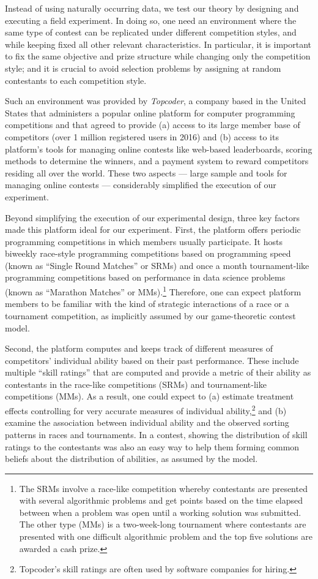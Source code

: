 \documentclass[10pt, titlepage]{article}
\begin{document}
Instead of using naturally occurring data, we test our theory by
designing and executing a field experiment. In doing so, one need an
environment where the same type of contest can be replicated under
different competition styles, and while keeping fixed all other relevant
characteristics. In particular, it is important to fix the same
objective and prize structure while changing only the competition style;
and it is crucial to avoid selection problems by assigning at random
contestants to each competition style.

Such an environment was provided by \emph{Topcoder}, a company based in
the United States that administers a popular online platform for
computer programming competitions and that agreed to provide (a) access
to its large member base of competitors (over 1 million registered users
in 2016) and (b) access to its platform's tools for managing online
contests like web-based leaderboards, scoring methods to determine the
winners, and a payment system to reward competitors residing all over
the world. These two aspects --- large sample and tools for managing
online contests --- considerably simplified the execution of our
experiment.

Beyond simplifying the execution of our experimental design, three key
factors made this platform ideal for our experiment. First, the platform
offers periodic programming competitions in which members usually
participate. It hosts biweekly race-style programming competitions based
on programming speed (known as ``Single Round Matches'' or SRMs) and
once a month tournament-like programming competitions based on
performance in data science problems (known as ``Marathon Matches'' or
MMs).\footnote{The SRMs involve a race-like competition whereby
  contestants are presented with several algorithmic problems and get
  points based on the time elapsed between when a problem was open until
  a working solution was submitted. The other type (MMs) is a
  two-week-long tournament where contestants are presented with one
  difficult algorithmic problem and the top five solutions are awarded a
  cash prize.} Therefore, one can expect platform members to be familiar
with the kind of strategic interactions of a race or a tournament
competition, as implicitly assumed by our game-theoretic contest model.

Second, the platform computes and keeps track of different measures of
competitors' individual ability based on their past performance. These
include multiple ``skill ratings'' that are computed and provide a
metric of their ability as contestants in the race-like competitions
(SRMs) and tournament-like competitions (MMs). As a result, one could
expect to (a) estimate treatment effects controlling for very accurate
measures of individual ability,\footnote{Topcoder's skill ratings are
  often used by software companies for hiring.} and (b) examine the
association between individual ability and the observed sorting patterns
in races and tournaments. In a contest, showing the distribution of
skill ratings to the contestants was also an easy way to help them
forming common beliefs about the distribution of abilities, as assumed
by the model.
\end{document}
